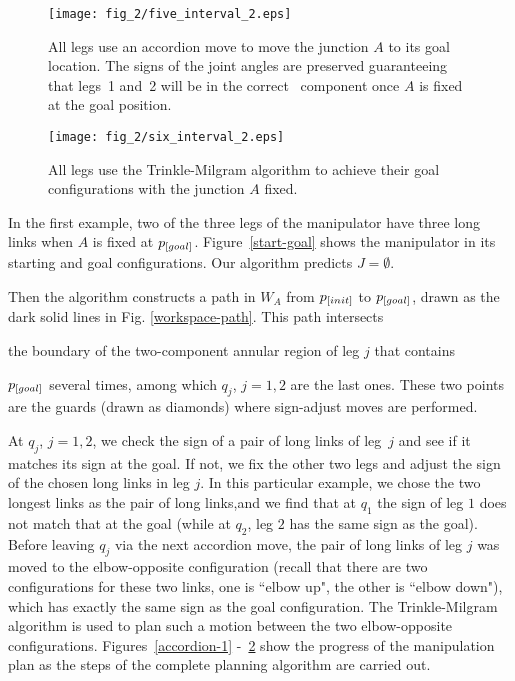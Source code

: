 %
\begin{figure}
  \centering
  \texttt{[image: fig\_2/five\_interval\_2.eps]}
  \caption{All legs use an accordion move to move the junction $A$ to its
  goal location.  The signs of the joint angles are preserved guaranteeing
  that legs~1 and~2 will be in the correct \cspace \ component once $A$ is fixed at
  the goal position.}
  \label{accordion_goal}
\end{figure}
%
\begin{figure}
  \centering
  \texttt{[image: fig\_2/six\_interval\_2.eps]}
  \caption{All legs use the Trinkle-Milgram algorithm to achieve their
  goal configurations with the junction $A$ fixed.}
  \label{TMalg}
\end{figure}

In the first example, two of the three legs of the manipulator
have three long links when $A$ is fixed at $p_{\textit{\rm{[}}goal]}$.
Figure~\ref{start-goal} shows the manipulator in its starting and
goal configurations. Our algorithm predicts $J=\emptyset$.

Then the algorithm constructs a path in $W_A$ from
$p_{\textit{\rm{[}}init]}$ to $p_{\textit{\rm{[}}goal]}$, drawn as the dark solid
lines in Fig. \ref{workspace-path}.  This path intersects

the boundary of the two-component annular region of leg $j$ that
contains

$p_{\textit{\rm{[}}goal]}$ several times, among which $q_j$, $j=1,2$ are
the last ones. These two points are the guards (drawn as diamonds)
where sign-adjust moves are performed.

At $q_j$, $j=1,2$, we check the sign of a pair of long links of
leg~$j$ and see if it matches its sign at the goal. If not, we fix
the other two legs and adjust the sign of the chosen long links in
leg $j$. In this particular example, we chose the two longest
links as the pair of long links,and we find that at $q_1$ the sign
of leg $1$ does not match that at the goal (while at $q_2$, leg
$2$ has the same sign as the goal). Before leaving $q_j$ via the
next accordion move, the pair of long links of leg $j$ was moved
to the elbow-opposite configuration (recall that there are two
configurations for these two links, one is ``elbow up", the other
is ``elbow down"), which has exactly the same sign as the goal
configuration. The Trinkle-Milgram algorithm \cite{MT2} is used to
plan such a motion between the two elbow-opposite configurations.
Figures~\ref{accordion-1} \--\ \ref{TMalg} show the progress of
the manipulation plan as the steps of the complete planning
algorithm are carried out.

